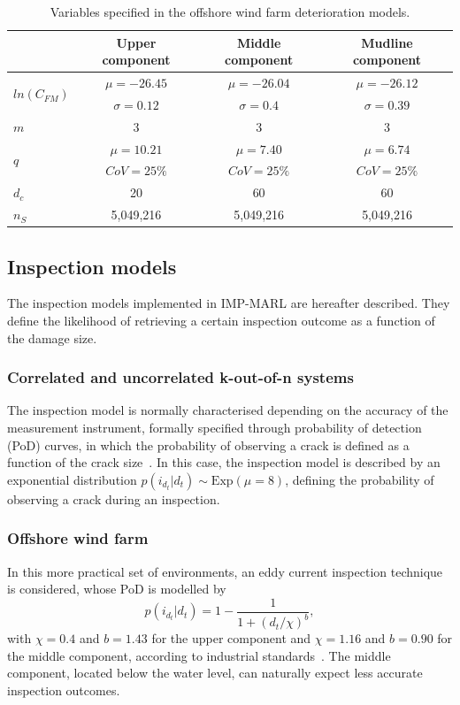 \begin{table}
\centering
\caption{Variables specified in the offshore wind farm deterioration models.}
\label{tab:owf_fatigue}
\begin{tabular}{lccc}
\toprule
 & Upper component & Middle component & Mudline component  \\
 \midrule
\multirow{2}{*}{$ln(C_{FM})$} & $\mu=-26.45$ & $\mu=-26.04$ & $\mu=-26.12$ \\
& $\sigma=0.12$ & $\sigma=0.4$ &  $\sigma=0.39$ \\
$m$ & 3 & 3 & 3 \\
\multirow{2}{*}{$q$}   & $\mu=10.21$  & $\mu=7.40$ & $\mu=6.74$  \\
 & $CoV=25\% $  & $CoV=25\% $ & $CoV=25\% $  \\
$d_c$ & 20 & 60 & 60 \\
$n_{S}$ & 5,049,216 & 5,049,216 & 5,049,216
\\
\bottomrule
\end{tabular}
\end{table}

\subsection{Inspection models}
The inspection models implemented in IMP-MARL are hereafter described. 
They define the likelihood of retrieving a certain inspection outcome as a function of the damage size.

\subsubsection{Correlated and uncorrelated k-out-of-n systems}
The inspection model is normally characterised depending on the accuracy of the measurement instrument, formally specified through probability of detection (PoD) curves, in which the probability of observing a crack is defined as a function of the crack size~\citep{morato2022optimal}.
In this case, the inspection model is described by an exponential distribution $p({i_{d_t}}|d_t) \sim \text{Exp}(\mu = 8)$, defining the probability of observing a crack during an inspection.

\subsubsection{Offshore wind farm}
In this more practical set of environments, an eddy current inspection technique is considered, whose PoD is modelled by
\begin{equation} \label{eq:ex_pod1}
    p({i_{d_t}}|d_t) = 1 - \frac{1}{1+(d_t/\chi)^b}, 
\end{equation}
with $\chi=0.4$ and $b=1.43$ for the upper component and $\chi=1.16$ and $b=0.90$ for the middle component, according to industrial standards~\citep{dnv2015probabilistic}.
The middle component, located below the water level, can naturally expect less accurate inspection outcomes.

